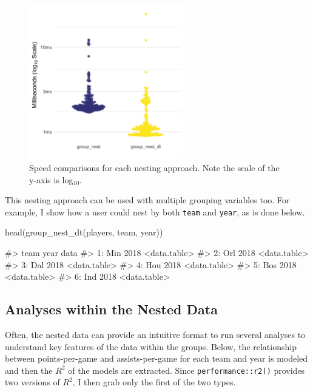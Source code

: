 \begin{figure}[tb]
  \centering
  \includegraphics[width=0.6\textwidth]{timings_manuscript.png}
  \caption{Speed comparisons for each nesting approach. Note the scale of the y-axis is log$_{10}$.}
  \label{speed}
\end{figure}

This nesting approach can be used with multiple grouping variables too.
For example, I show how a user could nest by both \texttt{team} and
\texttt{year}, as is done below.

\begin{Schunk}
\begin{Sinput}
head(group_nest_dt(players, team, year))
\end{Sinput}
\begin{Soutput}
#>    team year         data
#> 1:  Min 2018 <data.table>
#> 2:  Orl 2018 <data.table>
#> 3:  Dal 2018 <data.table>
#> 4:  Hou 2018 <data.table>
#> 5:  Bos 2018 <data.table>
#> 6:  Ind 2018 <data.table>
\end{Soutput}
\end{Schunk}

\hypertarget{analyses-within-the-nested-data}{%
\subsection{Analyses within the Nested
Data}\label{analyses-within-the-nested-data}}

Often, the nested data can provide an intuitive format to run several
analyses to understand key features of the data within the groups.
Below, the relationship between points-per-game and assists-per-game for
each team and year is modeled and then the \(R^2\) of the models are
extracted. Since \texttt{performance::r2()} provides two versions of
\(R^2\), I then grab only the first of the two types.

